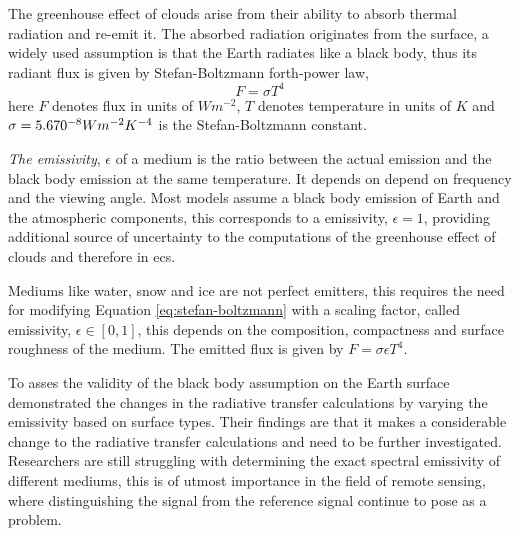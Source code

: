 The greenhouse effect of clouds arise from their ability to absorb thermal radiation and re-emit it. The absorbed radiation originates from the surface, a widely used assumption is that the Earth radiates like a black body, thus its radiant flux is given by Stefan-Boltzmann forth-power law, 
\begin{equation} \label{eq:stefan-boltzmann}
    F = \sigma  T ^4 %
\end{equation}
here $F$ denotes flux in units of $W m^{-2}$, $T$ denotes temperature in units of $K$ and $\sigma = 5.670 \time 10^{-8} W m^{-2} K^{-4}$ is the Stefan-Boltzmann constant. 

\textit{The emissivity}, $\epsilon$ of a medium is the ratio between the actual emission and the black body emission at the same temperature. It depends on depend on frequency and the viewing angle. Most models assume a black body emission of Earth and the atmospheric components, this corresponds to a emissivity, $\epsilon=1$, providing additional source of uncertainty to the computations of the greenhouse effect of clouds and therefore in \acrshort{ecs}.

Mediums like water, snow and ice are not perfect emitters, this requires the need for modifying Equation \eqref{eq:stefan-boltzmann} with a scaling factor, called emissivity, $\epsilon \in [0, 1]$, this depends on the composition, compactness and surface roughness of the medium. The emitted flux is given by $ F = \sigma \epsilon T ^4$. 

To asses the validity of the black body assumption on the Earth surface \citeauthor{Huang2018ImprovedClimate} demonstrated the changes in the radiative transfer calculations by varying the emissivity based on surface types. Their findings are that it makes a considerable change to the radiative transfer calculations and need to be further investigated. Researchers are still struggling with determining the exact spectral emissivity of different mediums, this is of utmost importance in the field of remote sensing, where distinguishing the signal from the reference signal continue to pose as a problem.

